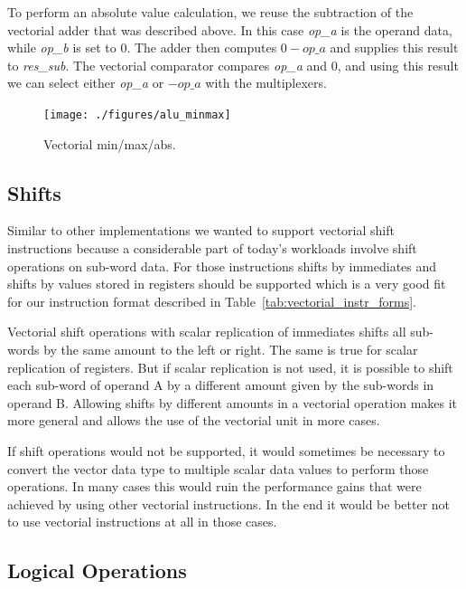 To perform an absolute value calculation, we reuse the subtraction of the
vectorial adder that was described above. In this case \textit{op\_a} is the
operand data, while \textit{op\_b} is set to 0. The adder then computes $0 -
\textit{op\_a}$ and supplies this result to \textit{res\_sub}.  The vectorial
comparator compares \textit{op\_a} and 0, and using this result we can select
either \textit{op\_a} or $-\textit{op\_a}$ with the multiplexers.

\begin{figure}[htbp]
  \centering
  \texttt{[image: ./figures/alu\_minmax]}
  \caption{Vectorial min/max/abs.}
  \label{fig:alu_minmax}
\end{figure}




\subsection{Shifts}

Similar to other implementations \cite{PLX,MAX2} we wanted to support vectorial shift
instructions because a considerable part of today's workloads involve shift
operations on sub-word data. For those instructions shifts by immediates and
shifts by values stored in registers should be supported which is a very good
fit for our instruction format described in
Table~\ref{tab:vectorial_instr_forms}.

Vectorial shift operations with scalar replication of immediates shifts all
sub-words by the same amount to the left or right. The same is true for scalar
replication of registers. But if scalar replication is not used, it is possible
to shift each sub-word of operand A by a different amount given by the sub-words
in operand B. Allowing shifts by different amounts in a vectorial operation
makes it more general and allows the use of the vectorial unit in more cases.

If shift operations would not be supported, it would sometimes be necessary to
convert the vector data type to multiple scalar data values to perform those
operations. In many cases this would ruin the performance gains that were
achieved by using other vectorial instructions.
In the end it would be better not to use vectorial instructions at all in those
cases.



\subsection{Logical Operations}

